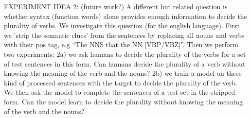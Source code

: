 EXPERIMENT IDEA 2:
(future work?) A different but related question is whether
syntax (function words) alone provides enough information 
to decide the plurality of verbs.
We investigate this question (for the english language). 
First we 'strip the semantic clues' from the sentences by replacing all nouns and verbs with their pos tag, e.g ``The NNS that the NN [VBP/VBZ]''. Then we perform two experiments: 
2a) we ask humans to decide the plurality of the verbs for a set of test sentences
in this form. Can humans decide the plurality of a verb without knowing the meaning of the verb and the nouns?
2b) we train a model on these kind of processed sentences with the target
to decide the plurality of the verb.
We then ask the model to complete the sentences of a test set in the stripped form. 
Can the model learn to decide the plurality without knowing the meaning of
the verb and the nouns?
